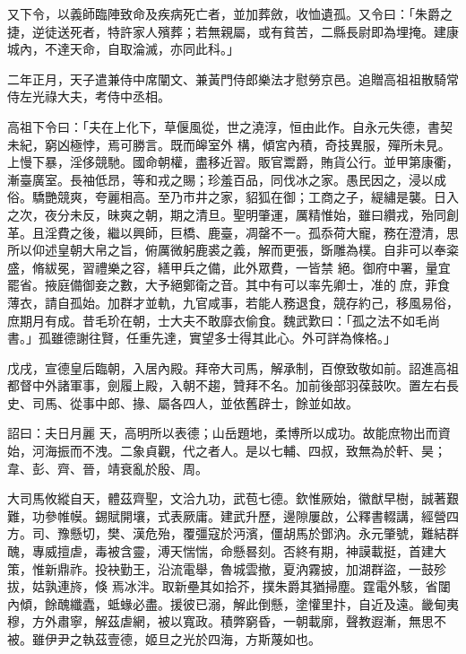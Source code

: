 \begin{pinyinscope}
 又下令，以義師臨陣致命及疾病死亡者，並加葬斂，收恤遺孤。又令曰：「朱爵之捷，逆徒送死者，特許家人殯葬；若無親屬，或有貧苦，二縣長尉即為埋掩。建康城內，不達天命，自取淪滅，亦同此科。」



 二年正月，天子遣兼侍中席闡文、兼黃門侍郎樂法才慰勞京邑。追贈高祖祖散騎常侍左光祿大夫，考侍中丞相。



 高祖下令曰：「夫在上化下，草偃風從，世之澆淳，恒由此作。自永元失德，書契未紀，窮凶極悖，焉可勝言。既而皞室外
 構，傾宮內積，奇技異服，殫所未見。上慢下暴，淫侈競馳。國命朝權，盡移近習。販官鬻爵，賄貨公行。並甲第康衢，漸臺廣室。長袖低昂，等和戎之賜；珍羞百品，同伐冰之家。愚民因之，浸以成俗。驕艷競爽，夸麗相高。至乃市井之家，貂狐在御；工商之子，緹繡是襲。日入之次，夜分未反，昧爽之朝，期之清旦。聖明肇運，厲精惟始，雖曰纘戎，殆同創革。且淫費之後，繼以興師，巨橋、鹿臺，凋罄不一。孤忝荷大寵，務在澄清，思所以仰述皇朝大帛之旨，俯厲微躬鹿裘之義，解而更張，斲雕為樸。自非可以奉粢盛，脩紱冕，習禮樂之容，繕甲兵之備，此外眾費，一皆禁
 絕。御府中署，量宜罷省。掖庭備御妾之數，大予絕鄭衛之音。其中有可以率先卿士，准的庶，菲食薄衣，請自孤始。加群才並軌，九官咸事，若能人務退食，競存約己，移風易俗，庶期月有成。昔毛玠在朝，士大夫不敢靡衣偷食。魏武歎曰：「孤之法不如毛尚書。」孤雖德謝往賢，任重先達，實望多士得其此心。外可詳為條格。」



 戊戌，宣德皇后臨朝，入居內殿。拜帝大司馬，解承制，百僚致敬如前。詔進高祖都督中外諸軍事，劍履上殿，入朝不趨，贊拜不名。加前後部羽葆鼓吹。置左右長史、司馬、從事中郎、掾、屬各四人，並依舊辟士，餘並如故。



 詔曰：夫日月麗
 天，高明所以表德；山岳題地，柔博所以成功。故能庶物出而資始，河海振而不洩。二象貞觀，代之者人。是以七輔、四叔，致無為於軒、昊；韋、彭、齊、晉，靖衰亂於殷、周。



 大司馬攸縱自天，體茲齊聖，文洽九功，武苞七德。欽惟厥始，徽猷早樹，誠著艱難，功參帷幙。錫賦開壤，式表厥庸。建武升歷，邊隙屢啟，公釋書輟講，經營四方。司、豫懸切，樊、漢危殆，覆彊寇於沔濱，僵胡馬於鄧汭。永元肇號，難結群醜，專威擅虐，毒被含靈，溥天惴惴，命懸晷刻。否終有期，神謨載挺，首建大策，惟新鼎祚。投袂勤王，沿流電舉，魯城雲撤，夏汭霧披，加湖群盜，一鼓殄拔，姑孰連旍，倏
 焉冰泮。取新壘其如拾芥，撲朱爵其猶掃塵。霆電外駭，省闥內傾，餘醜纖蠹，蚳蝝必盡。援彼已溺，解此倒懸，塗懽里抃，自近及遠。畿甸夷穆，方外肅寧，解茲虐網，被以寬政。積弊窮昏，一朝載廓，聲教遐漸，無思不被。雖伊尹之執茲壹德，姬旦之光於四海，方斯蔑如也。




\end{pinyinscope}
